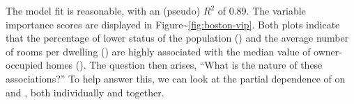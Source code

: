 The model fit is reasonable, with an  (pseudo) \(R^2\)
of 0.89. The variable importance scores are displayed in
Figure\textasciitilde{}\ref{fig:boston-vip}. Both plots indicate that
the percentage of lower status of the population () and the
average number of rooms per dwelling () are highly associated
with the median value of owner-occupied homes (). The
question then arises, ``What is the nature of these associations?'' To
help answer this, we can look at the partial dependence of 
on  and , both individually and together.



\address{%
Author One\\
Affiliation\\%
line 1\\ line 2\\
%
\url{https://journal.r-project.org}\\%
\textit{ORCiD: \href{https://orcid.org/0000-0002-9079-593X}{0000-0002-9079-593X}}\\%
\href{mailto:author1@work}{\nolinkurl{author1@work}}%
}
